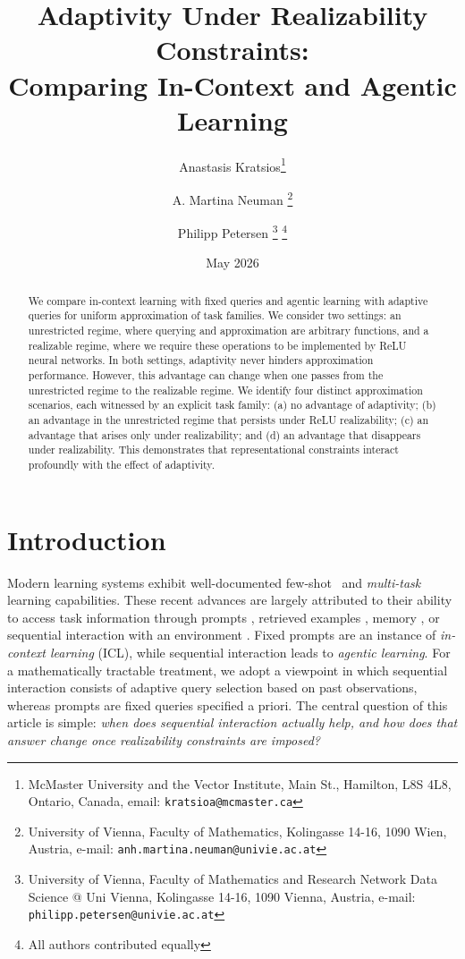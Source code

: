 \documentclass{article}
\title{Adaptivity Under Realizability Constraints:\\
Comparing In-Context and Agentic Learning}
\author{Anastasis Kratsios\thanks{McMaster University and the Vector Institute, Main St., Hamilton, L8S 4L8, Ontario, Canada, email: \texttt{kratsioa@mcmaster.ca}} \footnotemark[4] \and A. Martina Neuman \thanks{University of Vienna, Faculty of Mathematics, Kolingasse 14-16,
    1090 Wien, Austria, 
    e-mail: \texttt{anh.martina.neuman@univie.ac.at}
  } \footnotemark[4] \and Philipp Petersen \thanks{
    University of Vienna,
    Faculty of Mathematics and Research Network Data Science @ Uni Vienna, Kolingasse 14-16,
    1090 Vienna, Austria, 
    e-mail: \texttt{philipp.petersen@univie.ac.at}
  } \thanks{All authors contributed equally}}
\date{May 2026}
\begin{document}
\maketitle

\begin{abstract}
We compare in-context learning with fixed queries and 
agentic learning with adaptive queries for uniform
approximation of task families. 
We consider two settings: 
an unrestricted regime,  
where querying and approximation are  
arbitrary functions, and a realizable regime, 
where we require these operations to be implemented by ReLU neural networks. 
In both settings, adaptivity never hinders approximation performance. 
However, this advantage can change when one passes from the unrestricted regime to the realizable regime.
We identify four distinct approximation scenarios, each witnessed by an explicit task family: (a) no advantage of adaptivity; (b) an advantage in the unrestricted regime that persists under ReLU realizability; (c) an advantage that arises only under realizability; and (d) an advantage that disappears under realizability.
This demonstrates that representational constraints interact profoundly with the effect of adaptivity.
\end{abstract}

\section{Introduction}

Modern learning systems exhibit %
well-documented few-shot~\cite{brown2020,li2025transformers} and \emph{multi-task}~\cite{Caruana1997Multitask,ArgyriouEvgeniouPontil2008ConvexMTL,MishraEtAl2022NaturalInstructions,WangEtAl2022SuperNaturalInstructions} learning capabilities. 
These recent advances are largely attributed to their ability to access task information through prompts \cite{brown2020}, retrieved examples \cite{lewis2020rag}, memory \cite{park2023generative}, or sequential interaction with an environment \cite{yao2023react}. %
Fixed prompts are an instance of \emph{in-context learning} (ICL), while sequential interaction leads to \emph{agentic learning}. 
For a mathematically tractable treatment, we adopt a viewpoint in which sequential interaction consists of adaptive query selection based on past observations, whereas prompts are fixed queries specified a priori.
The central question of this article is simple: \emph{when does sequential interaction actually help, and how does that answer change once realizability constraints are imposed?}
\end{document}

